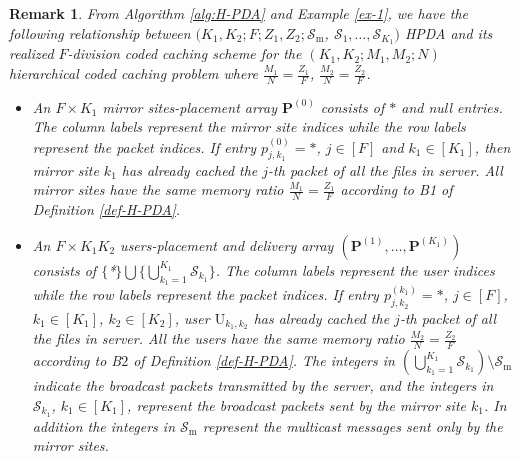 \documentclass[onecolumn,10pt]{IEEEtran}
\theoremstyle{mythm}
\newtheorem{remark}{Remark}
\begin{document}
\begin{remark}
\label{re-relationship-HPDA-HCCS}
From Algorithm \ref{alg:H-PDA} and Example \ref{ex-1}, we have the following relationship between $(K_1,K_2;F;Z_1,Z_2;\mathcal{S}_\text{m}$, $\mathcal{S}_1,\ldots,\mathcal{S}_{K_1})$ HPDA and its realized $F$-division coded caching scheme for the $(K_1,K_2; M_1,M_2; N)$ hierarchical coded caching problem where $\frac{M_1}{N}=\frac{Z_1}{F}$, $\frac{M_2}{N}=\frac{Z_2}{F}$.
\begin{itemize}
\item An $F\times K_1$ mirror sites-placement array $\mathbf{P}^{(0)}$ consists of $*$ and null entries. The column labels represent the mirror site indices while the row labels represent the packet indices. If entry $p^{(0)}_{j,k_1}= *$, $j\in[F]$ and $k_1 \in [K_1]$, then mirror site $k_1$ has already cached the $j$-th packet of all the files in server. All mirror sites have the same memory ratio $\frac{M_1}{N}=\frac{Z_1}{F}$ according to B1 of Definition \ref{def-H-PDA}.
\item An $F\times K_1K_2$ users-placement and delivery array $(\mathbf{P}^{(1)},\ldots,\mathbf{P}^{(K_1)})$ consists of $ \{$*$\}\bigcup\{\bigcup_{k_1=1}^{K_1}\mathcal{S}_{k_1}\}$. The column labels represent the user indices while the row labels represent the packet indices. If entry $p^{(k_1)}_{j,k_2} =*$, $j\in[F]$, $k_1\in[K_1]$, $k_2 \in [K_2]$, user $\text{U}_{k_1,k_2}$ has already cached the $j$-th packet of all the files in server. All the users have the same memory ratio $\frac{M_2}{N}=\frac{Z_2}{F}$ according to B$2$ of Definition \ref{def-H-PDA}. The integers in $\left(\bigcup_{k_1=1}^{K_1}\mathcal{S}_{k_1}\right)\setminus\mathcal{S}_\text{m}$ indicate the broadcast packets transmitted by the server, and the integers in $\mathcal{S}_{k_1}$, $k_1\in[K_1]$, represent the broadcast packets sent by the mirror site $k_1$. In addition the integers in $\mathcal{S}_\text{m}$ represent the multicast messages sent only by the mirror sites.

\end{itemize}
\end{remark}
\end{document}
